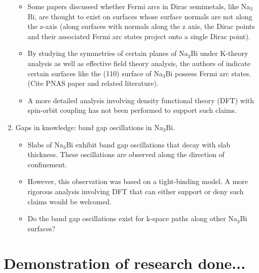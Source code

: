 \documentclass[english]{revtex4-1}
\begin{document}
\begin{enumerate}
    \begin{itemize}
    
        \item Some papers discussed whether Fermi arcs in Dirac semimetals, like Na$_3$Bi, are thought to exist on surfaces whose surface normals are not along the z-axis (along surfaces with normals along the z axis, the Dirac points and their associated Fermi arc states project onto a single Dirac point). \cite{kargarian_are_2016}

        \item By studying the symmetries of certain planes  of Na$_{3}$Bi under K-theory analysis as well as effective field theory analysis, the authors of \cite{kargarian_are_2016} indicate certain surfaces like the (110) surface of Na$_{3}$Bi possess Fermi arc states. (Cite PNAS paper and related literature).

        \item A more detailed analysis involving density functional theory (DFT) with spin-orbit coupling has not been performed to support such claims.

    \end{itemize}
   
     \item Gaps in knowledge: band gap oscillations in  Na$_3$Bi.
   
    \begin{itemize}
        
        \item Slabs of Na$_{3}$Bi exhibit band gap oscillations that decay with slab thickness. These oscillations are observed along the direction of confinement. \cite{xiao_anisotropic_2015}
        
        \item However, this observation was based on a tight-binding model.\cite{xiao_anisotropic_2015} A more rigorous analysis involving DFT that can either support or deny such claims would be welcomed.
        
        \item Do the band gap oscillations exist for k-space paths along other Na$_{3}$Bi surfaces?
        
    \end{itemize}



\end{enumerate}


\section{Demonstration of research done...}
\end{document}
